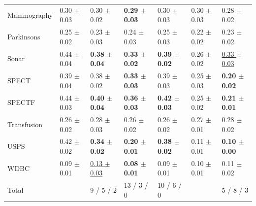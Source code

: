 \documentclass[smallcondensed]{svjour3}\usepackage[]{graphicx}\usepackage[]{color}
\begin{document}
\begin{table}[t]
\begin{tabular}{lllll|ll}
  Mammography & 0.30 $\pm$ 0.03 & 0.30 $\pm$ 0.02 & \textbf{0.29 $\pm$ 0.03} & 0.30 $\pm$ 0.03 & 0.30 $\pm$ 0.03 & 0.28 $\pm$ 0.02 \\ 
  Parkinsons & 0.25 $\pm$ 0.02 & 0.23 $\pm$ 0.03 & 0.24 $\pm$ 0.03 & 0.25 $\pm$ 0.03 & 0.22 $\pm$ 0.02 & 0.23 $\pm$ 0.02 \\ 
  Sonar & 0.44 $\pm$ 0.04 & \textbf{0.38 $\pm$ 0.04} & \textbf{0.33 $\pm$ 0.02} & \textbf{0.39 $\pm$ 0.02} & 0.26 $\pm$ 0.02 & \underline{0.33 $\pm$ 0.03} \\ 
  SPECT & 0.39 $\pm$ 0.04 & 0.38 $\pm$ 0.02 & \textbf{0.33 $\pm$ 0.03} & 0.39 $\pm$ 0.03 & 0.25 $\pm$ 0.03 & \textbf{0.20 $\pm$ 0.02} \\ 
  SPECTF & 0.44 $\pm$ 0.03 & \textbf{0.40 $\pm$ 0.04} & \textbf{0.36 $\pm$ 0.03} & \textbf{0.42 $\pm$ 0.03} & 0.25 $\pm$ 0.02 & \textbf{0.21 $\pm$ 0.01} \\ 
  Transfusion & 0.26 $\pm$ 0.02 & 0.28 $\pm$ 0.03 & 0.26 $\pm$ 0.02 & 0.26 $\pm$ 0.02 & 0.27 $\pm$ 0.01 & 0.28 $\pm$ 0.02 \\ 
  USPS & 0.42 $\pm$ 0.02 & \textbf{0.34 $\pm$ 0.02} & \textbf{0.20 $\pm$ 0.01} & \textbf{0.38 $\pm$ 0.02} & 0.11 $\pm$ 0.01 & \textbf{0.10 $\pm$ 0.00} \\ 
  WDBC & 0.09 $\pm$ 0.01 & \underline{0.13 $\pm$ 0.03} & \textbf{0.08 $\pm$ 0.01} & 0.09 $\pm$ 0.01 & 0.10 $\pm$ 0.01 & 0.11 $\pm$ 0.02 \\ 
   \midrule
Total &  & 9 / 5 / 2 & 13 / 3 / 0 & 10 / 6 / 0 &  & 5 / 8 / 3 \\ 
   \bottomrule

\end{tabular}
\end{table}
\end{document}
